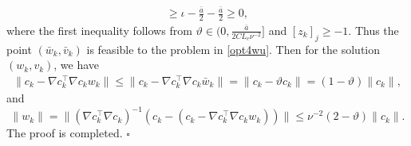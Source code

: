 \documentclass[11pt]{article}
\newenvironment{proof}{{\noindent\it Proof.}\quad}{\hfill $\square$\par}
\begin{document}
\begin{proof}
\begin{align*}
        \geq \iota - \frac{\bar a}{2} - \frac{\bar a}{2} \geq 0,
    \end{align*}
    where the first inequality follows from \(\vartheta \in (0,\frac{\bar a}{2CL_c\nu^{-2}}]\) and $[z_k]_j\ge -1$. Thus the point \((\bar w_k, \bar v_k)\) is feasible to the problem in \eqref{opt4wu}. Then for the solution \((w_k,v_k)\), we have
    \begin{align*}
        \|c_k - \nabla c_k^\top \nabla c_k w_k\| \leq \|c_k - \nabla c_k^\top \nabla c_k \bar w_k\| = \|c_k - \vartheta c_k\| = (1-\vartheta)\|c_k\|,
    \end{align*}
    and
    \[
    \|w_k\| = \|(\nabla c_k^\top \nabla c_k)^{-1}(c_k - (c_k - \nabla c_k^\top \nabla c_k w_k))\| \leq \nu^{-2}(2-\vartheta)\|c_k\|.
    \]
    The proof is completed.
\end{proof}
\end{document}
